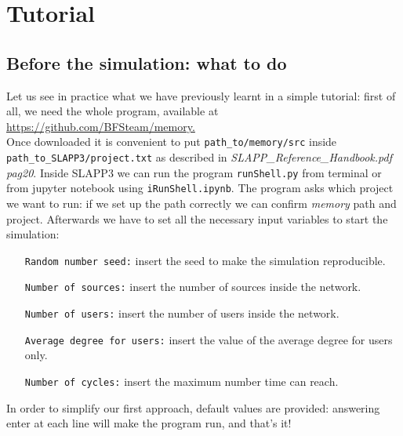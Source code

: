 \section{Tutorial}\label{sec:tutorial}
\subsection{Before the simulation: what to do}\label{subsec:before}
Let us see in practice what we have previously learnt in a simple tutorial:
first of all, we need the whole program, available at \url{https://github.com/BFSteam/memory.}\\
Once downloaded it is convenient to put \texttt{path\_to/memory/src} inside
\texttt{path\_to\_SLAPP3/project.txt} as described in \textit{SLAPP\_Reference\_Handbook.pdf pag20}.
Inside SLAPP3 we can run the program \texttt{runShell.py} from terminal
or from jupyter notebook using \texttt{iRunShell.ipynb}.
The program asks which project we want to run: if we set up the path correctly
we can confirm \textit{memory} path and project.
Afterwards we have to set all the necessary input variables to start
the simulation:
\begin{itemize}
\item[\texttt{Random number seed:}] insert the seed to make the simulation reproducible.
\item[\texttt{Number of sources:}]insert the number of sources inside the network.
\item[\texttt{Number of users:}]insert the number of users inside the network.
\item[\texttt{Average degree for users:}]insert the value of the average degree for users only.
\item[\texttt{Number of cycles:}]insert the maximum number time can reach.
\end{itemize}

In order to simplify our first approach, default values are provided:
answering enter at each line will make the program run, and that's it!\\

